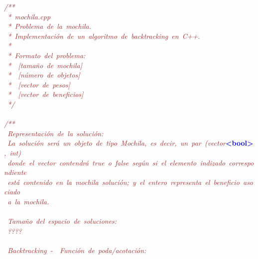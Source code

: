 \noindent
\mbox{}\textit{\textcolor{Brown}{/**}} \\
\mbox{}\textit{\textcolor{Brown}{\ *\ mochila.cpp}} \\
\mbox{}\textit{\textcolor{Brown}{\ *\ Problema\ de\ la\ mochila.}} \\
\mbox{}\textit{\textcolor{Brown}{\ *\ Implementación\ de\ un\ algoritmo\ de\ backtracking\ en\ C++.}} \\
\mbox{}\textit{\textcolor{Brown}{\ *}} \\
\mbox{}\textit{\textcolor{Brown}{\ *\ Formato\ del\ problema:}} \\
\mbox{}\textit{\textcolor{Brown}{\ *\ \ [tamaño\ de\ mochila]}} \\
\mbox{}\textit{\textcolor{Brown}{\ *\ \ [número\ de\ objetos]}} \\
\mbox{}\textit{\textcolor{Brown}{\ *\ \ [vector\ de\ pesos]}} \\
\mbox{}\textit{\textcolor{Brown}{\ *\ \ [vector\ de\ beneficios]}} \\
\mbox{}\textit{\textcolor{Brown}{\ */}} \\
\mbox{} \\
\mbox{}\textit{\textcolor{Brown}{/**}} \\
\mbox{}\textit{\textcolor{Brown}{\ Representación\ de\ la\ solución:}} \\
\mbox{}\textit{\textcolor{Brown}{\ La\ solución\ será\ un\ objeto\ de\ tipo\ Mochila,\ es\ decir,\ un\ par\ (vector}}\textbf{\textcolor{Blue}{\textless{}bool\textgreater{}}}\textit{\textcolor{Brown}{,\ int)}} \\
\mbox{}\textit{\textcolor{Brown}{\ donde\ el\ vector\ contendrá\ true\ o\ false\ según\ si\ el\ elemento\ indizado\ correspondiente}} \\
\mbox{}\textit{\textcolor{Brown}{\ está\ contenido\ en\ la\ mochila\ solución;\ y\ el\ entero\ representa\ el\ beneficio\ asociado}} \\
\mbox{}\textit{\textcolor{Brown}{\ a\ la\ mochila.}} \\
\mbox{} \\
\mbox{}\textit{\textcolor{Brown}{\ Tamaño\ del\ espacio\ de\ soluciones:}} \\
\mbox{}\textit{\textcolor{Brown}{\ ????}} \\
\mbox{} \\
\mbox{}\textit{\textcolor{Brown}{\ Backtracking\ -\ \ Función\ de\ poda/acotación:}} \\
